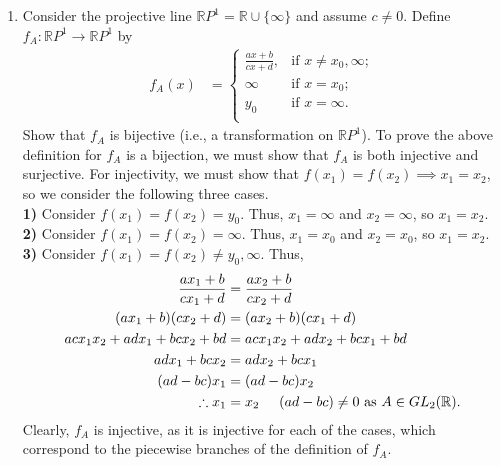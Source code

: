 \documentclass[a4paper,11pt]{article}
\newcommand{\ds}{\displaystyle}
\begin{document}
{{\begin{enumerate}[leftmargin=*]
\begin{enumerate}
				\item Consider the projective line $\ds{\mathbb{R}P^1 = \mathbb{R}\cup\{\infty\}}$ and assume $\ds{c \neq 0}$. Define $\ds{f_A : \mathbb{R}P^1 \rightarrow \mathbb{R}P^1}$ by
					\begin{align*}
						f_A(x) & = 
						\begin{cases}
							\frac{ax+b}{cx+d}, & \text{if } x \neq x_0, \infty;\\
							\infty 			   & \text{if } x = x_0;\\
							y_0				   & \text{if } x = \infty.\\
						\end{cases}
					\end{align*}
					Show that $\ds{f_A}$ is bijective (i.e., a transformation on $\ds{\mathbb{R}P^1}$).
					\bigbreak
					To prove the above definition for $\ds{f_A}$ is a bijection, we must show that $\ds{f_A}$ is both injective and surjective. For injectivity, we must show that $\ds{f(x_1) = f(x_2) \implies x_1 = x_2}$, so we consider the following three cases.\\
					\textbf{1)} Consider $\ds{f(x_1) = f(x_2) = y_0}$. Thus, $\ds{x_1 = \infty}$ and $\ds{x_2 = \infty}$, so $\ds{x_1 = x_2}$. \\
					\textbf{2)} Consider $\ds{f(x_1) = f(x_2) = \infty}$. Thus, $\ds{x_1 = x_0}$ and $\ds{x_2 = x_0}$, so $\ds{x_1 = x_2}$. \\
					\textbf{3)} Consider $\ds{f(x_1) = f(x_2) \neq y_0, \infty}$. Thus,
					\begin{align*}
						\frac{ax_1 + b}{cx_1 + d} & = \frac{ax_2 + b}{cx_2 + d}\\
						(ax_1 + b)(cx_2 + d) & = (ax_2 + b)(cx_1 + d)\\
						acx_1x_2 + adx_1 + bcx_2 + bd & = acx_1x_2 + adx_2 + bcx_1 + bd\\
						adx_1 + bcx_2 & = adx_2 + bcx_1\\
						(ad - bc)x_1 & = (ad - bc)x_2\\
						\therefore x_1 & = x_2 \hspace{5mm} (ad-bc) \neq 0 \text{ as } A \in GL_2(\mathbb{R}).\\
					\end{align*}
					Clearly, $\ds{f_A}$ is injective, as it is injective for each of the cases, which correspond to the piecewise branches of the definition of $\ds{f_A}$.\\

					\pagebreak


\end{enumerate}
\end{enumerate}}}
\end{document}
